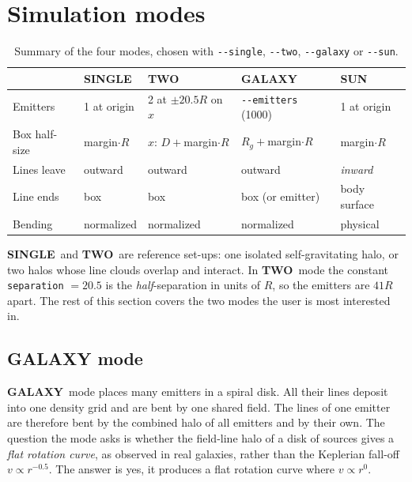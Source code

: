 \documentclass[12pt]{article}
\newcommand{\GALAXY}{\textcolor{galaxyc}{\textbf{\textsf{GALAXY}}}}
\newcommand{\SUN}{\textcolor{sunc}{\textbf{\textsf{SUN}}}}
\newcommand{\SINGLE}{\textbf{\textsf{SINGLE}}}
\newcommand{\TWO}{\textbf{\textsf{TWO}}}
\newcommand{\opt}[1]{\texttt{-{}-#1}}
\begin{document}
\section{Simulation modes}

\begin{table}[H]
\centering
\small
\begin{tabular}{@{}lllll@{}}
\toprule
& \SINGLE & \TWO & \GALAXY & \SUN \\
\midrule
Emitters & 1 at origin & 2 at $\pm20.5R$ on $x$ & \opt{emitters} (1000) & 1 at origin \\
Box half-size & margin$\cdot R$ & $x$: $D+$margin$\cdot R$ & $R_g+$margin$\cdot R$ & margin$\cdot R$ \\
Lines leave & outward & outward & outward & \emph{inward} \\
Line ends & box & box & box (or emitter) & body surface \\
Bending & normalized & normalized & normalized & physical \\
\bottomrule
\end{tabular}
\caption{Summary of the four modes, chosen with \opt{single}, \opt{two}, \opt{galaxy} or \opt{sun}.}
\end{table}

\SINGLE\ and \TWO\ are reference set-ups: one isolated self-gravitating halo,
or two halos whose line clouds overlap and interact. In \TWO\ mode the
constant \texttt{separation} $=20.5$ is the \emph{half}-separation in units
of $R$, so the emitters are $41R$ apart. The rest of this section covers the two
modes the user is most interested in.

\subsection{GALAXY mode}
\label{sec:galaxy}

\begin{galaxybox}
\GALAXY\ mode places many emitters in a spiral disk. All their lines deposit
into one density grid and are bent by one shared field. The lines of one
emitter are therefore bent by the combined halo of all emitters and by their own. The question
the mode asks is whether the field-line halo of a disk of sources gives a
\emph{flat rotation curve}, as observed in real galaxies, rather than the
Keplerian fall-off $v\propto r^{-0.5}$. The answer is yes, it produces a flat rotation curve where $v\propto r^{0}$.
\end{galaxybox}
\end{document}
